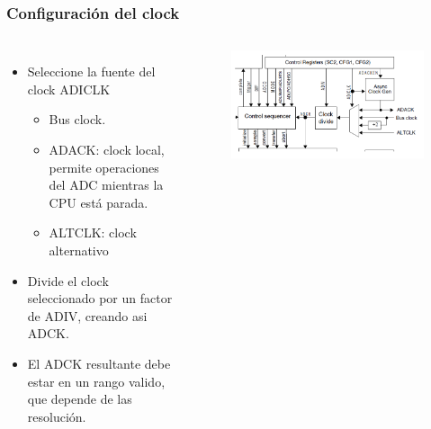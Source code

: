 \documentclass[10.5pt,scale=1.0,t,aspectratio=169,hyperref={pdfpagelabels=false}]{beamer}
\begin{document}
\begin{frame}[fragile]
	\frametitle{Configuración del clock}
	{\small
		\begin{columns}
			\begin{itemize}
				\item Seleccione la fuente del clock ADICLK
				\begin{itemize}
					\item Bus clock.
					\item ADACK: clock local, permite operaciones del ADC mientras la CPU está parada.
					\item ALTCLK: clock alternativo
				\end{itemize}
				\item Divide el clock seleccionado por un factor de ADIV, creando asi ADCK.
				\item El ADCK resultante debe estar en un rango valido, que depende de las resolución. 
			\end{itemize}
			
			\begin{figure}
				\centering
				\includegraphics[scale=0.5]{fig_ClockADC}
			\end{figure}
		\end{columns}
	}
\end{frame}
\end{document}
